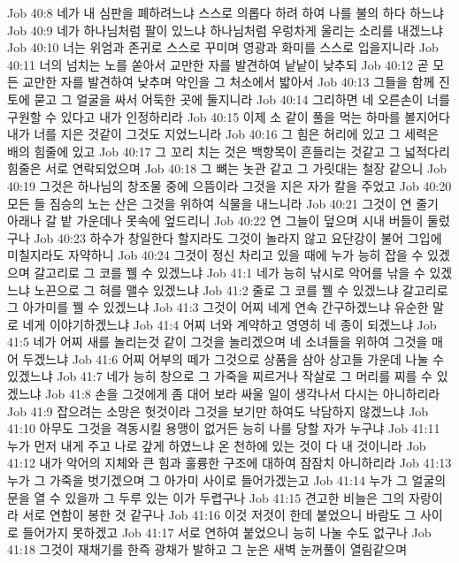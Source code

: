 Job 40:8  네가 내 심판을 폐하려느냐 스스로 의롭다 하려 하여 나를 불의 하다 하느냐
Job 40:9  네가 하나님처럼 팔이 있느냐 하나님처럼 우렁차게 울리는 소리를 내겠느냐
Job 40:10  너는 위엄과 존귀로 스스로 꾸미며 영광과 화미를 스스로 입을지니라
Job 40:11  너의 넘치는 노를 쏟아서 교만한 자를 발견하여 낱낱이 낮추되
Job 40:12  곧 모든 교만한 자를 발견하여 낮추며 악인을 그 처소에서 밟아서
Job 40:13  그들을 함께 진토에 묻고 그 얼굴을 싸서 어둑한 곳에 둘지니라
Job 40:14  그리하면 네 오른손이 너를 구원할 수 있다고 내가 인정하리라
Job 40:15  이제 소 같이 풀을 먹는 하마를 볼지어다 내가 너를 지은 것같이 그것도 지었느니라
Job 40:16  그 힘은 허리에 있고 그 세력은 배의 힘줄에 있고
Job 40:17  그 꼬리 치는 것은 백향목이 흔들리는 것같고 그 넓적다리 힘줄은 서로 연락되었으며
Job 40:18  그 뼈는 놋관 같고 그 가릿대는 철장 같으니
Job 40:19  그것은 하나님의 창조물 중에 으뜸이라 그것을 지은 자가 칼을 주었고
Job 40:20  모든 들 짐승의 노는 산은 그것을 위하여 식물을 내느니라
Job 40:21  그것이 연 줄기 아래나 갈 밭 가운데나 못속에 엎드리니
Job 40:22  연 그늘이 덮으며 시내 버들이 둘렀구나
Job 40:23  하수가 창일한다 할지라도 그것이 놀라지 않고 요단강이 불어 그입에 미칠지라도 자약하니
Job 40:24  그것이 정신 차리고 있을 때에 누가 능히 잡을 수 있겠으며 갈고리로 그 코를 꿸 수 있겠느냐
Job 41:1  네가 능히 낚시로 악어를 낚을 수 있겠느냐 노끈으로 그 혀를 맬수 있겠느냐
Job 41:2  줄로 그 코를 꿸 수 있겠느냐 갈고리로 그 아가미를 꿸 수 있겠느냐
Job 41:3  그것이 어찌 네게 연속 간구하겠느냐 유순한 말로 네게 이야기하겠느냐
Job 41:4  어찌 너와 계약하고 영영히 네 종이 되겠느냐
Job 41:5  네가 어찌 새를 놀리는것 같이 그것을 놀리겠으며 네 소녀들을 위하여 그것을 매어 두겠느냐
Job 41:6  어찌 어부의 떼가 그것으로 상품을 삼아 상고들 가운데 나눌 수 있겠느냐
Job 41:7  네가 능히 창으로 그 가죽을 찌르거나 작살로 그 머리를 찌를 수 있겠느냐
Job 41:8  손을 그것에게 좀 대어 보라 싸울 일이 생각나서 다시는 아니하리라
Job 41:9  잡으려는 소망은 헛것이라 그것을 보기만 하여도 낙담하지 않겠느냐
Job 41:10  아무도 그것을 격동시킬 용맹이 없거든 능히 나를 당할 자가 누구냐
Job 41:11  누가 먼저 내게 주고 나로 갚게 하였느냐 온 천하에 있는 것이 다 내 것이니라
Job 41:12  내가 악어의 지체와 큰 힘과 훌륭한 구조에 대하여 잠잠치 아니하리라
Job 41:13  누가 그 가죽을 벗기겠으며 그 아가미 사이로 들어가겠는고
Job 41:14  누가 그 얼굴의 문을 열 수 있을까 그 두루 있는 이가 두렵구나
Job 41:15  견고한 비늘은 그의 자랑이라 서로 연함이 봉한 것 같구나
Job 41:16  이것 저것이 한데 붙었으니 바람도 그 사이로 들어가지 못하겠고
Job 41:17  서로 연하여 붙었으니 능히 나눌 수도 없구나
Job 41:18  그것이 재채기를 한즉 광채가 발하고 그 눈은 새벽 눈꺼풀이 열림같으며
